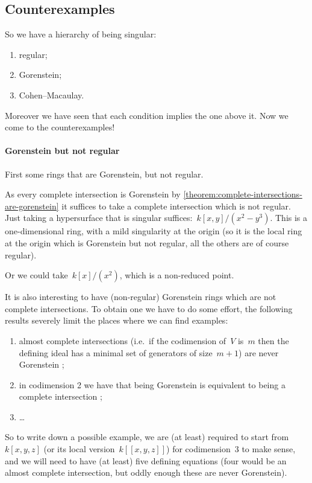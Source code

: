 \documentclass[10pt,a4paper]{article}
\begin{document}
\subsection{Counterexamples}
So we have a hierarchy of being singular:
\begin{enumerate}
  \item regular;
  \item Gorenstein;
  \item Cohen--Macaulay.
\end{enumerate}
Moreover we have seen that each condition implies the one above it. Now we come to the counterexamples!

\paragraph{Gorenstein but not regular}
First some rings that are Gorenstein, but not regular.
\begin{example}
  As every complete intersection is Gorenstein by \cref{theorem:complete-intersections-are-gorenstein} it suffices to take a complete intersection which is not regular. Just taking a hypersurface that is singular suffices:~$k[x,y]/(x^2-y^3)$. This is a one-dimensional ring, with a mild singularity at the origin (so it is the local ring at the origin which is Gorenstein but not regular, all the others are of course regular).
  
  Or we could take~$k[x]/(x^2)$, which is a non-reduced point.
\end{example}
It is also interesting to have (non-regular) Gorenstein rings which are not complete intersections. To obtain one we have to do some effort, the following results severely limit the places where we can find examples:
\begin{enumerate}
  \item almost complete intersections (i.e.\ if the codimension of~$V$ is~$m$ then the defining ideal has a minimal set of generators of size~$m+1$) are never Gorenstein \addreference;
  \item in codimension 2 we have that being Gorenstein is equivalent to being a complete intersection \cite[corollary 21.20]{eisenbud-commutative-algebra};
  \item \ldots
\end{enumerate}
So to write down a possible example, we are (at least) required to start from~$k[x,y,z]$ (or its local version~$k[[x,y,z]]$) for codimension~$3$ to make sense, and we will need to have (at least) five defining equations (four would be an almost complete intersection, but oddly enough these are never Gorenstein).
\end{document}
